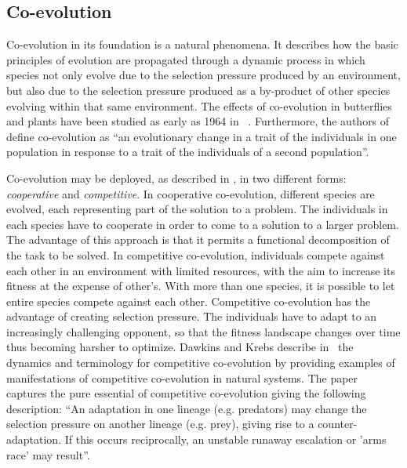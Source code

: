 \documentclass[conference]{IEEEtran}
\begin{document}
\subsection{Co-evolution}
Co-evolution in its foundation is a natural phenomena.
It describes how the basic principles of evolution are propagated through a dynamic process in which species not only evolve due to the selection pressure produced by an environment, but also due to the selection pressure produced as a by-product of other species evolving within that same environment.
The effects of co-evolution in butterflies and plants have been studied as early as 1964 in ~\cite{ehrlich1964butterflies}.
Furthermore, the authors of ~\cite{janzen1980coevolution} define co-evolution as ``an evolutionary change in a trait of the individuals in one population in response to a trait of the individuals of a second population''. 

Co-evolution may be deployed, as described in \cite{eiben2003introduction}, in two different forms: \textit{cooperative} and \textit{competitive}.
In cooperative co-evolution, different species are evolved, each representing part of the solution to a problem.
The individuals in each species have to cooperate in order to come to a solution to a larger problem.
The advantage of this approach is that it permits a functional decomposition of the task to be solved.
In competitive co-evolution, individuals compete against each other in an environment with limited resources, with the aim to increase its fitness at the expense of other's.
With more than one species, it is possible to let entire species compete against each other.
Competitive co-evolution has the advantage of creating selection pressure.
The individuals have to adapt to an increasingly challenging opponent, so that the fitness landscape changes over time thus becoming harsher to optimize.
Dawkins and Krebs describe in~\cite{dawkins1979arms} the dynamics and terminology for competitive co-evolution by providing examples of manifestations of competitive co-evolution in natural systems. 
The paper captures the pure essential of competitive co-evolution giving the following description: ``An adaptation in one lineage (e.g. predators) may change the selection pressure on another lineage (e.g. prey), giving rise to a counter-adaptation. If this occurs reciprocally, an unstable runaway escalation or 'arms race' may result''.
\end{document}
